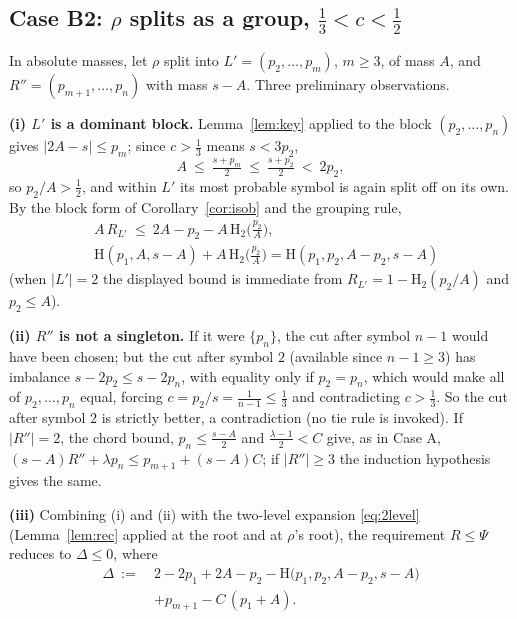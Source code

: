 \documentclass[journal]{IEEEtran}
\theoremstyle{definition}
\newcommand{\Hh}{\mathrm H_2}
\newcommand{\CC}{C}
\newcommand{\lam}{\lambda}
\begin{document}
\subsection*{Case B2: $\rho$ splits as a group, $\tfrac13<c<\tfrac12$}

In absolute masses, let $\rho$ split into $L'=(p_2,\dots,p_m)$, $m\ge3$, of
mass $A$, and $R''=(p_{m+1},\dots,p_n)$ with mass $s-A$. Three preliminary
observations.

\textbf{(i) $L'$ is a dominant block.} Lemma~\ref{lem:key} applied to the block
$(p_2,\dots,p_n)$ gives $|2A-s|\le p_m$; since $c>\tfrac13$ means $s<3p_2$,
\[
  A\ \le\ \tfrac{s+p_m}2\ \le\ \tfrac{s+p_2}2\ <\ 2p_2,
\]
so $p_2/A>\tfrac12$, and within $L'$ its most probable symbol is again split off on its own. By the block
form of Corollary~\ref{cor:isob} and the grouping rule,
\[
\begin{aligned}
  &A\,R_{L'}\ \le\ 2A-p_2-A\,\Hh\bigl(\tfrac{p_2}A\bigr),\\
  &\mathrm H(p_1,A,s{-}A)+A\,\Hh\bigl(\tfrac{p_2}A\bigr)
  =\mathrm H(p_1,p_2,A{-}p_2,s{-}A)
\end{aligned}
\]
(when $|L'|=2$ the displayed bound is immediate from $R_{L'}=1-\Hh(p_2/A)$ and
$p_2\le A$).

\textbf{(ii) $R''$ is not a singleton.} If it were $\{p_n\}$, the cut after symbol
$n-1$ would have been chosen; but the cut after symbol $2$ (available since
$n-1\ge3$) has imbalance $s-2p_2\le s-2p_n$, with equality only if
$p_2=p_n$, which would make all of $p_2,\dots,p_n$ equal, forcing
$c=p_2/s=\tfrac1{n-1}\le\tfrac13$ and contradicting $c>\tfrac13$. So the cut
after symbol $2$ is strictly better, a contradiction (no tie rule is invoked). If $|R''|=2$,
the chord bound, $p_n\le\tfrac{s-A}2$ and $\tfrac{\lam-1}2<\CC$ give, as in
Case A, $(s-A)R''+\lam p_n\le p_{m+1}+(s-A)\CC$; if $|R''|\ge3$ the induction
hypothesis gives the same.

\textbf{(iii)} Combining (i) and (ii) with the two-level expansion \eqref{eq:2level}
(Lemma~\ref{lem:rec} applied at the root and at $\rho$'s root), the requirement
$R\le\Psi$ reduces to $\Delta\le0$, where
\begin{equation}\label{eq:B2}
\begin{split}
  \Delta\ :=\ &2-2p_1+2A-p_2-\mathrm H\bigl(p_1,p_2,A{-}p_2,s{-}A\bigr)\\
  &+p_{m+1}-\CC\,(p_1+A).
\end{split}
\end{equation}
\end{document}
